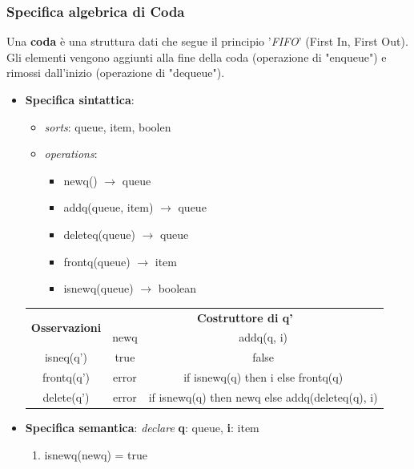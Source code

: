 \documentclass{article}
\begin{document}
	\subsubsection{Specifica algebrica di Coda}
	Una \textbf{coda} è una struttura dati che segue il principio '\textit{FIFO}' (First In, First Out). Gli elementi vengono aggiunti alla fine della coda (operazione di "enqueue") e rimossi dall'inizio (operazione di "dequeue").
	\begin{itemize}
		\item \textbf{Specifica sintattica}:
		\begin{itemize}
			\item \textit{sorts}: queue, item, boolen
			\item \textit{operations}:
			\begin{itemize}
				\item newq() $\rightarrow$ queue
				\item addq(queue, item) $\rightarrow$ queue
				\item deleteq(queue) $\rightarrow$ queue
				\item frontq(queue) $\rightarrow$ item
				\item isnewq(queue) $\rightarrow$ boolean
			\end{itemize}
		\end{itemize}
		\begin{center}
			\begin{tabular}{|c|cc|}
			\hline
			\multirow{2}{*}{\textbf{Osservazioni}} & \multicolumn{2}{c|}{\textbf{Costruttore di q'}} \\ \cline{2-3} 
												& \multicolumn{1}{c|}{newq}    & addq(q, i)   \\ \hline
			isneq(q')                              & \multicolumn{1}{c|}{true}       & false            \\ \hline
			frontq(q')                              & \multicolumn{1}{c|}{error}       & if isnewq(q) then i else frontq(q)              \\ \hline
			delete(q')                            & \multicolumn{1}{c|}{error}        & if isnewq(q) then newq else addq(deleteq(q), i)          \\ \hline
			\end{tabular}
		\end{center}
		\item \textbf{Specifica semantica}: 
		\textit{declare} \textbf{q}: queue, \textbf{i}: item
		\begin{enumerate}
			\item isnewq(newq) = true

\end{enumerate}
\end{itemize}
\end{document}
